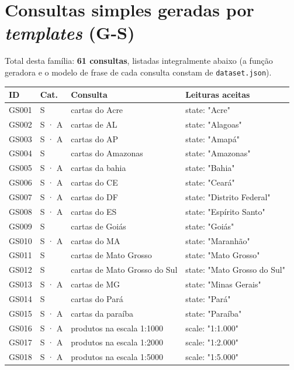 
\section{Consultas simples geradas por \textit{templates} (G-S)}

Total desta fam\'ilia: \textbf{61 consultas}, listadas integralmente abaixo (a fun\c{c}\~ao geradora e o modelo de frase de cada consulta constam de \texttt{dataset.json}).

{\footnotesize
\begin{longtable}{|p{1.1cm}|p{1.3cm}|p{5.4cm}|p{6.3cm}|}
\hline
\textbf{ID} & \textbf{Cat.} & \textbf{Consulta} & \textbf{Leituras aceitas} \\ \hline
\endhead
GS001 & S & cartas do Acre & state: "Acre" \\ \hline
GS002 & S · A & cartas de AL & state: "Alagoas" \\ \hline
GS003 & S · A & cartas do AP & state: "Amapá" \\ \hline
GS004 & S & cartas do Amazonas & state: "Amazonas" \\ \hline
GS005 & S · A & cartas da bahia & state: "Bahia" \\ \hline
GS006 & S · A & cartas do CE & state: "Ceará" \\ \hline
GS007 & S · A & cartas do DF & state: "Distrito Federal" \\ \hline
GS008 & S · A & cartas do ES & state: "Espírito Santo" \\ \hline
GS009 & S & cartas de Goiás & state: "Goiás" \\ \hline
GS010 & S · A & cartas do MA & state: "Maranhão" \\ \hline
GS011 & S & cartas de Mato Grosso & state: "Mato Grosso" \\ \hline
GS012 & S & cartas de Mato Grosso do Sul & state: "Mato Grosso do Sul" \\ \hline
GS013 & S · A & cartas de MG & state: "Minas Gerais" \\ \hline
GS014 & S & cartas do Pará & state: "Pará" \\ \hline
GS015 & S · A & cartas da paraíba & state: "Paraíba" \\ \hline
GS016 & S · A & produtos na escala 1:1000 & scale: "1:1.000" \\ \hline
GS017 & S · A & produtos na escala 1:2000 & scale: "1:2.000" \\ \hline
GS018 & S · A & produtos na escala 1:5000 & scale: "1:5.000" \\ \hline

\end{longtable}}
